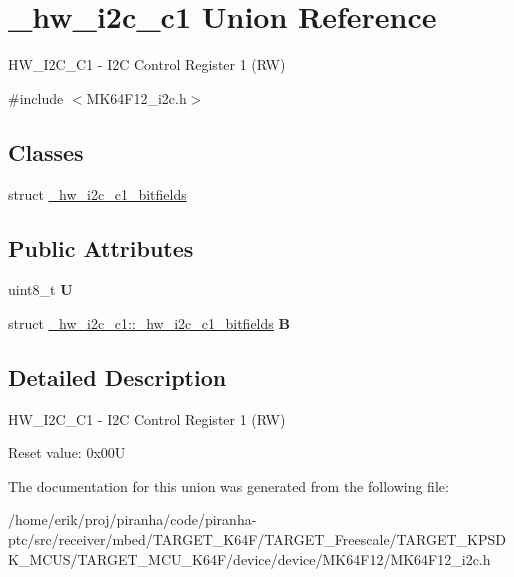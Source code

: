 \hypertarget{union__hw__i2c__c1}{}\section{\+\_\+hw\+\_\+i2c\+\_\+c1 Union Reference}
\label{union__hw__i2c__c1}


H\+W\+\_\+\+I2\+C\+\_\+\+C1 -\/ I2C Control Register 1 (RW)  




{\ttfamily \#include $<$M\+K64\+F12\+\_\+i2c.\+h$>$}

\subsection*{Classes}
\begin{DoxyCompactItemize}
\item 
struct \hyperlink{struct__hw__i2c__c1_1_1__hw__i2c__c1__bitfields}{\+\_\+hw\+\_\+i2c\+\_\+c1\+\_\+bitfields}
\end{DoxyCompactItemize}
\subsection*{Public Attributes}
\begin{DoxyCompactItemize}
\item 
uint8\+\_\+t {\bfseries U}\hypertarget{union__hw__i2c__c1_ad5c8693f4fde1904fbe04f63f62e958f}{}\label{union__hw__i2c__c1_ad5c8693f4fde1904fbe04f63f62e958f}

\item 
struct \hyperlink{struct__hw__i2c__c1_1_1__hw__i2c__c1__bitfields}{\+\_\+hw\+\_\+i2c\+\_\+c1\+::\+\_\+hw\+\_\+i2c\+\_\+c1\+\_\+bitfields} {\bfseries B}\hypertarget{union__hw__i2c__c1_a21af7abbe89dc19faeb3630d2d90d423}{}\label{union__hw__i2c__c1_a21af7abbe89dc19faeb3630d2d90d423}

\end{DoxyCompactItemize}


\subsection{Detailed Description}
H\+W\+\_\+\+I2\+C\+\_\+\+C1 -\/ I2C Control Register 1 (RW) 

Reset value\+: 0x00U 

The documentation for this union was generated from the following file\+:\begin{DoxyCompactItemize}
\item 
/home/erik/proj/piranha/code/piranha-\/ptc/src/receiver/mbed/\+T\+A\+R\+G\+E\+T\+\_\+\+K64\+F/\+T\+A\+R\+G\+E\+T\+\_\+\+Freescale/\+T\+A\+R\+G\+E\+T\+\_\+\+K\+P\+S\+D\+K\+\_\+\+M\+C\+U\+S/\+T\+A\+R\+G\+E\+T\+\_\+\+M\+C\+U\+\_\+\+K64\+F/device/device/\+M\+K64\+F12/M\+K64\+F12\+\_\+i2c.\+h\end{DoxyCompactItemize}
